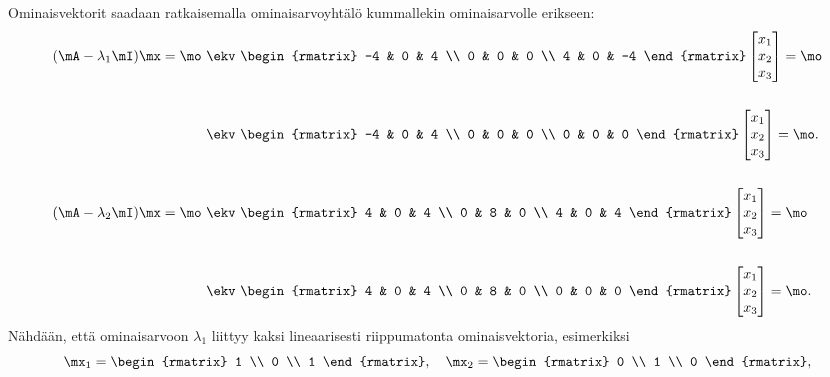 Ominaisvektorit saadaan ratkaisemalla ominaisarvoyhtälö kummallekin ominaisarvolle erikseen:
\begin{align*}
(\mA-\lambda_1\mI)\mx=\mo \ &\ekv \ \begin{rmatrix} 
                                    -4 & 0 & 4 \\ 0 & 0 & 0 \\ 4 & 0 & -4 
                                    \end{rmatrix}
\begin{bmatrix} x_1 \\ x_2 \\ x_3 \end{bmatrix} = \mo \\ \\
&\ekv \ \begin{rmatrix} -4 & 0 & 4 \\ 0 & 0 & 0 \\ 0 & 0 & 0 \end{rmatrix}
\begin{bmatrix} x_1 \\ x_2 \\ x_3 \end{bmatrix} = \mo. \\ \\
(\mA-\lambda_2\mI)\mx=\mo \ &\ekv \ \begin{rmatrix} 
                                    4 & 0 & 4 \\ 0 & 8 & 0 \\ 4 & 0 & 4 
                                    \end{rmatrix}
\begin{bmatrix} x_1 \\ x_2 \\ x_3 \end{bmatrix} = \mo \\ \\
&\ekv \ \begin{rmatrix} 4 & 0 & 4 \\ 0 & 8 & 0 \\ 0 & 0 & 0 \end{rmatrix}
\begin{bmatrix} x_1 \\ x_2 \\ x_3 \end{bmatrix} = \mo.
\end{align*}
Nähdään, että  ominaisarvoon $\lambda_1$ liittyy kaksi lineaarisesti riippumatonta 
ominaisvektoria, esimerkiksi
\[
\mx_1=\begin{rmatrix} 1 \\ 0 \\ 1 \end{rmatrix},\quad 
\mx_2=\begin{rmatrix} 0 \\ 1 \\ 0 \end{rmatrix},
\]
